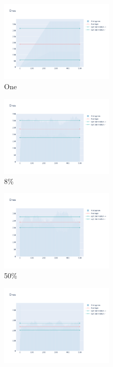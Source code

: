 \documentclass[12pt, fleqn]{report}                             %
\theoremstyle{break}                                            %
\begin{document}
      \begin{figure}[ht!]
        \centering
        \begin{subfigure}[b]{0.4\linewidth}
          \includegraphics[width=0.6\textwidth]{Images/54/dia-a.png}
          \caption{One}
        \end{subfigure}
        \begin{subfigure}[b]{0.4\linewidth}
          \includegraphics[width=0.6\textwidth]{Images/54/dia-b.png}
          \caption{8\%}
        \end{subfigure}
        \begin{subfigure}[b]{0.4\linewidth}
          \includegraphics[width=0.6\textwidth]{Images/54/dia-c.png}
          \caption{50\%}
        \end{subfigure}
        \begin{subfigure}[b]{0.4\linewidth}
          \includegraphics[width=0.6\textwidth]{Images/54/dia-d.png}

\end{subfigure}
\end{figure}
\end{document}

